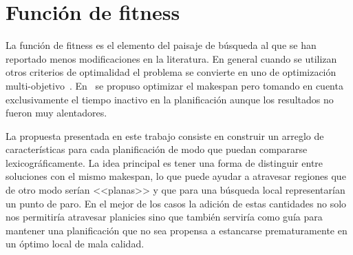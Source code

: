 \section{Función de fitness}\label{prop:fitness}
La función de fitness es el elemento del paisaje de búsqueda al que se han reportado menos modificaciones en la literatura. 
%
En general cuando se utilizan otros criterios de optimalidad el problema se convierte en uno de optimización 
multi-objetivo~\cite{gong2019effective,sakawa2000fuzzy,ponnambalam2001multiobjective}.
%
En~\cite{uckun1993managing} se propuso optimizar el makespan pero tomando en cuenta exclusivamente el tiempo inactivo en la planificación 
aunque los resultados no fueron muy alentadores.   

La propuesta presentada en este trabajo consiste en construir un arreglo de características para cada planificación de modo que puedan 
compararse lexicográficamente. 
%
La idea principal es tener una forma de distinguir entre soluciones con el mismo makespan, lo que puede ayudar a atravesar regiones que de 
otro modo serían <<planas>> y que para una búsqueda local representarían un punto de paro. 
%
En el mejor de los casos la adición de estas cantidades no solo nos permitiría atravesar planicies sino que también serviría como guía para
mantener una planificación que no sea propensa a estancarse prematuramente en un óptimo local de mala calidad.

